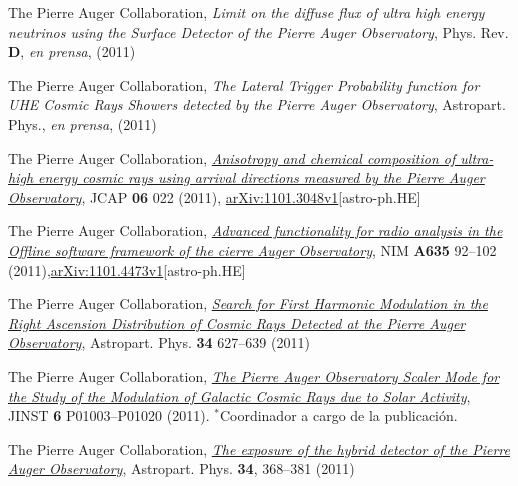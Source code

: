 \documentclass[11pt, a4paper]{article}
\newcommand{\years}[1]{\marginnote{\scriptsize #1}}
\begin{document}
\years{2011}The Pierre Auger Collaboration, {\emph{Limit on the diffuse flux of
ultra high energy neutrinos using the Surface Detector of the Pierre Auger
Observatory}}, Phys. Rev. {\bf D}, {\emph{en prensa}}, (2011)

\years{2011}The Pierre Auger Collaboration, {\emph{The Lateral Trigger
Probability function for UHE Cosmic Rays Showers detected by the Pierre Auger
Observatory}}, Astropart. Phys., {\emph{en prensa}}, (2011)

\years{2011}The Pierre Auger Collaboration,
\href{http://dx.doi.org/10.1088/1475-7516/2011/06/022}{\emph{Anisotropy and
chemical composition of ultra-high energy cosmic rays using arrival directions
measured by the Pierre Auger Observatory}}, JCAP {\bf 06} 022 (2011),
\href{http://arxiv.org/abs/1106.3048}{arXiv:1101.3048v1}[astro-ph.HE]

\years{2011}The Pierre Auger Collaboration,
\href{http://dx.doi.org/10.1016/j.nima.2011.01.049}{{\emph{Advanced
functionality for radio analysis in the Offline software framework of the
cierre Auger Observatory}}}, NIM {\bf A635} 92--102
(2011),\href{http://arxiv.org/abs/1101.4473}{arXiv:1101.4473v1}[astro-ph.HE]

\years{2011}The Pierre Auger Collaboration,
\href{http://dx.doi.org/10.1016/j.astropartphys.2010.12.007}{\emph{Search for
First Harmonic Modulation in the Right Ascension Distribution of Cosmic Rays
Detected at the Pierre Auger Observatory}}, Astropart. Phys. {\bf 34} 627--639
(2011)

\years{2011}The Pierre Auger Collaboration,
\href{http://dx.doi.org/10.1088/1748-0221/6/01/P01003}{\emph{The Pierre Auger
Observatory Scaler Mode for the Study of the Modulation of Galactic Cosmic Rays
due to Solar Activity}}, JINST {\bf 6} P01003--P01020 (2011). $^*$Coordinador a cargo de la publicación.

\years{2010}The Pierre Auger Collaboration,
\href{http://dx.doi.org/10.1016/j.astropartphys.2010.10.001}{\emph{The exposure
of the hybrid detector of the Pierre Auger Observatory}}, Astropart. Phys. {\bf
34}, 368--381 (2011)
\end{document}
